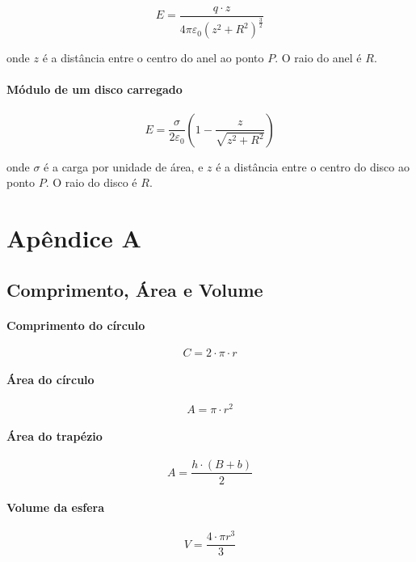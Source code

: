 \[
E = \frac{q \cdot z}{4 \pi \varepsilon_0 (z^2 + R^2)^\frac{3}{2}}
\]

onde $z$ é a distância entre o centro do anel ao ponto $P$. O raio do
anel é $R$.

\paragraph{Módulo de um disco
carregado}\label{muxf3dulo-de-um-disco-carregado}

\[
E = \frac{\sigma}{2 \varepsilon_0}(1 - \frac{z}{\sqrt{z^2 + R^2}})
\]

onde $\sigma$ é a carga por unidade de área, e $z$ é a distância entre o
centro do disco ao ponto $P$. O raio do disco é $R$.

\section{Apêndice A}\label{apuxeandice-a}

\subsection{Comprimento, Área e
Volume}\label{comprimento-uxe1rea-e-volume}

\paragraph{Comprimento do círculo}\label{comprimento-do-cuxedrculo}

\[
C = 2 \cdot \pi \cdot r
\]

\paragraph{Área do círculo}\label{uxe1rea-do-cuxedrculo}

\[
A = \pi \cdot r^2
\]

\paragraph{Área do trapézio}\label{uxe1rea-do-trapuxe9zio}

\[
A = \frac{h \cdot (B + b)}{2}
\]

\paragraph{Volume da esfera}\label{volume-da-esfera}

\[
V = \frac{4 \cdot \pi r^3}{3}
\]

